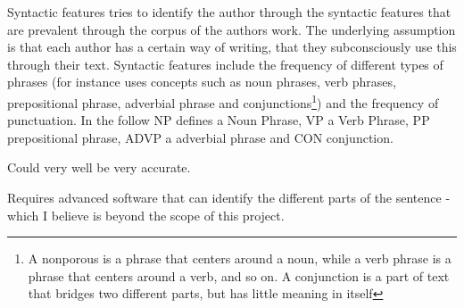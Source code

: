 {\label{syntactic}
Syntactic features tries to identify the author through the syntactic
features that are prevalent through the corpus of the authors
work. The underlying assumption is that each author has a certain way of writing, that they subconsciously use this through their text. Syntactic features include the frequency of different types of phrases (for instance \cite{style} uses concepts such as noun phrases, verb phrases, prepositional phrase, adverbial phrase and conjunctions\footnote{A nonporous is a phrase that centers around a noun, while a verb phrase is a phrase that centers around a verb, and so on. A conjunction is a part of text that bridges two different parts, but has little meaning in itself}) and the frequency of punctuation.
} 
{
In the follow NP defines a Noun Phrase, VP a Verb Phrase, PP prepositional phrase, ADVP a adverbial phrase and CON conjunction.
}
{
\item Could very well be very accurate.
}{
\item Requires advanced software that can identify the different parts of the sentence - which I believe is beyond the scope of this project.

}

